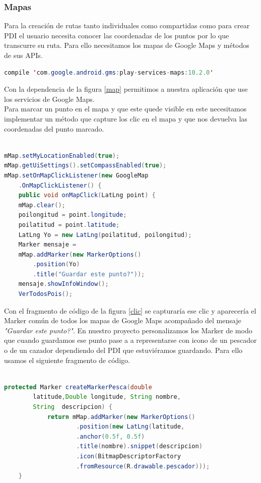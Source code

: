 \subsubsection{Mapas}

 Para la creación de rutas tanto individuales como compartidas como para crear PDI el usuario necesita conocer las coordenadas de los puntos por lo que transcurre su ruta. Para ello necesitamos los mapas de Google Maps y métodos de sus APIs.
 
 
 \begin{lstlisting}[language=java,caption={Dependencia de Google Maps en gradle},label=map]
compile 'com.google.android.gms:play-services-maps:10.2.0'

\end{lstlisting}
 
 Con la dependencia de la figura \ref{map} permitimos a nuestra aplicación que use los servicios de  Google Maps.\\
 Para marcar un punto en el mapa y que este quede visible en este necesitamos implementar un método que capture los clic en el mapa y que nos devuelva las coordenadas del punto marcado.
 
 
 \begin{lstlisting}[language=java,caption={Captura de clic en la pantalla},label=clic]
    
mMap.setMyLocationEnabled(true);
mMap.getUiSettings().setCompassEnabled(true);
mMap.setOnMapClickListener(new GoogleMap
	.OnMapClickListener() {
	public void onMapClick(LatLng point) {
	mMap.clear();
	poilongitud = point.longitude;
	poilatitud = point.latitude;
	LatLng Yo = new LatLng(poilatitud, poilongitud);
	Marker mensaje = 
	mMap.addMarker(new MarkerOptions()
		.position(Yo)
		.title("Guardar este punto?"));
  	mensaje.showInfoWindow();
	VerTodosPois();

\end{lstlisting} 
 
 
 
 
  Con el fragmento de código de la figura \ref{clic}  se capturaría ese clic y aparecería el Marker común de todos los mapas de Google Maps acompañado del mensaje \textit{"Guardar este punto?"}. En nuestro proyecto personalizamos los Marker de modo que cuando guardamos ese punto pase a a representarse con icono de un pescador o de un cazador dependiendo del PDI que estuviéramos guardando. Para ello usamos el siguiente fragmento de código.

 

\begin{lstlisting}[language=java,caption={Creación de Marker  personalizados},label=DescriptiveLabel]
    
protected Marker createMarkerPesca(double
		latitude,Double longitude, String nombre,
		String	descripcion) {
       		return mMap.addMarker(new MarkerOptions()
                	.position(new LatLng(latitude, 							longitude))
                	.anchor(0.5f, 0.5f)
                	.title(nombre).snippet(descripcion)
	                .icon(BitmapDescriptorFactory
    	       		.fromResource(R.drawable.pescador)));
    }


\end{lstlisting} 
 
